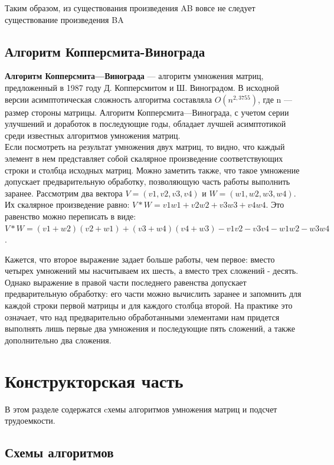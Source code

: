 \documentclass[a4paper,12pt]{report}
\begin{document}
Таким образом, из существования произведения AB вовсе не следует существование произведения BA

\section{Алгоритм Копперсмита-Винограда}
\hspace{0.6cm} \textbf {Алгоритм Копперсмита—Винограда} — алгоритм умножения матриц, предложенный в 1987 году Д. Копперсмитом и Ш. Виноградом. В исходной версии асимптотическая сложность алгоритма составляла $O(n^{2,3755})$, где n — размер стороны матрицы. Алгоритм Копперсмита—Винограда, с учетом серии улучшений и доработок в последующие годы, обладает лучшей асимптотикой среди известных алгоритмов умножения матриц.\\
Если посмотреть на результат умножения двух матриц, то видно, что каждый элемент в нем представляет собой скалярное произведение соответствующих строки и столбца исходных матриц. Можно заметить также, что такое умножение допускает предварительную обработку, позволяющую часть работы выполнить заранее. 
Рассмотрим два вектора
$V = (v1, v2, v3, v4)$ и
$W = (w1, w2, w3, w4)$.
Их скалярное произведение равно: 
$V * W = v1w1 + v2w2 + v3w3 + v4w4$.
Это равенство можно переписать в виде: 
$V * W = (v1 + w2)(v2 + w1) + (v3 + w4)(v4 + w3) - v1v2 - v3v4 - w1w2 - w3w4$.

Кажется, что второе выражение задает больше работы, чем первое: вместо четырех умножений мы насчитываем их шесть, а вместо трех сложений - десять. Однако выражение в правой части последнего равенства допускает предварительную обработку: его части можно вычислить заранее и запомнить для каждой строки первой матрицы и для каждого столбца второй. На практике это означает, что над предварительно обработанными элементами нам придется выполнять лишь первые два умножения и последующие пять сложений, а также дополнительно два сложения.

\chapter{Конструкторская часть}
\hspace{0.6cm}В этом разделе содержатся cхемы алгоритмов умножения матриц и подсчет трудоемкости.
\newpage
\section{Схемы алгоритмов}
\end{document}
